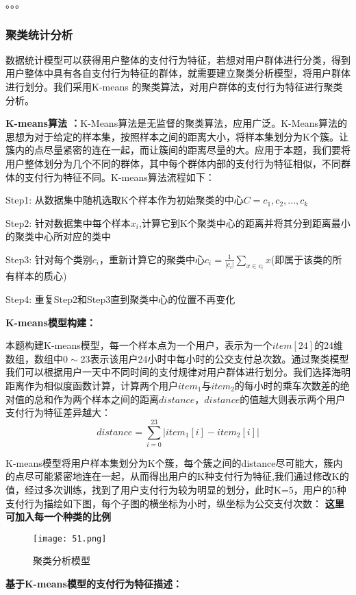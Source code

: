 \documentclass[withoutpreface,bwprint]{cumcmthesis} %
\begin{document}
。。。
\subsubsection{聚类统计分析}
数据统计模型可以获得用户整体的支付行为特征，若想对用户群体进行分类，得到用户整体中具有各自支付行为特征的群体，就需要建立聚类分析模型，将用户群体进行划分。我们采用K-means 的聚类算法，对用户群体的支付行为特征进行聚类分析。

\textbf{K-means算法 ：}K-Means算法是无监督的聚类算法，应用广泛。K-Means算法的思想为对于给定的样本集，按照样本之间的距离大小，将样本集划分为K个簇。让簇内的点尽量紧密的连在一起，而让簇间的距离尽量的大。应用于本题，我们要将用户整体划分为几个不同的群体，其中每个群体内部的支付行为特征相似，不同群体的支付行为特征不同。K-means算法流程如下：

Step1: 从数据集中随机选取K个样本作为初始聚类的中心$C={c_1,c_2,...,c_k}$

Step2: 针对数据集中每个样本$x_i$,计算它到K个聚类中心的距离并将其分到距离最小的聚类中心所对应的类中

Step3: 针对每个类别$c_i$，重新计算它的聚类中心$c_i=\frac{1}{\left|c_i\right|}\sum_{x \in c_i}x$(即属于该类的所有样本的质心)

Step4: 重复Step2和Step3直到聚类中心的位置不再变化

\textbf{K-means模型构建：}

本题构建K-means模型，每一个样本点为一个用户，表示为一个$item[24]$的24维数组，数组中$0\sim23$表示该用户24小时中每小时的公交支付总次数。通过聚类模型我们可以根据用户一天中不同时间的支付规律对用户群体进行划分。我们选择海明距离作为相似度函数计算，计算两个用户$item_1$与$item_2$的每小时的乘车次数差的绝对值的总和作为两个样本之间的距离$distance$，$distance$的值越大则表示两个用户支付行为特征差异越大：
\begin{equation}
distance=\sum_{i=0}^{23}|item_1[i]-item_2[i]|
\end{equation}

K-means模型将用户样本集划分为K个簇，每个簇之间的distance尽可能大，簇内的点尽可能紧密地连在一起，从而得出用户的K种支付行为特征,我们通过修改K的值，经过多次训练，找到了用户支付行为较为明显的划分，此时K=5，用户的5种支付行为描绘如下图，每个子图的横坐标为小时，纵坐标为公交支付次数：
\textbf{这里可加入每一个种类的比例}
\begin{figure}[h]
\centering
\texttt{[image: 51.png]}
\caption{聚类分析模型}
\end{figure}

\textbf{基于K-means模型的支付行为特征描述：}
\end{document}
